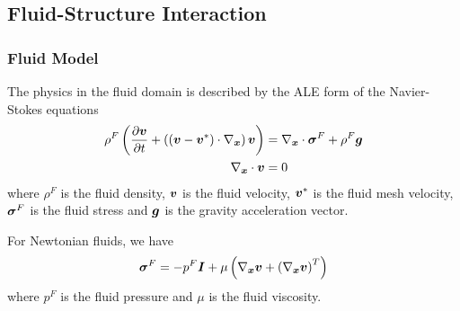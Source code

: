 \subsection{Fluid-Structure Interaction}

\subsubsection{Fluid Model}

The physics in the fluid domain is described by the ALE form of the Navier-Stokes equations
\ie
\begin{align}
  \rho^{F}\pbrac{\delby{\vectr{v}}{t}+\pbrac{\dotprod{\pbrac{\vectr{v}-\vectr{v}^{*}}}{\grad_{\vectr{x}}}}\vectr{v}}&=\divergence{\vectr{x}}{\tensor{\sigma}^{F}}+\rho^{F}\vectr{g}\label{eqn:FSINavStokesMomentum}
  \\
    \divergence{\vectr{x}}{\vectr{v}}&=0 \label{eqn:FSINavStokesContinuity}
\end{align}
where $\rho^{F}$ is the fluid density, $\boldsymbol{v}$ is the fluid velocity,
$\boldsymbol{v}^{*}$ is the fluid mesh velocity, $\boldsymbol{\mathit{\sigma}}^{F}$ is the fluid
stress and $\boldsymbol{g}$ is the gravity acceleration vector.

For Newtonian fluids, we have
\begin{equation}
  \tensor{\sigma}^{F}=-p^{F}\tensor{I}+\mu\pbrac{\gradient{\vectr{x}}{\vectr{v}}+\transpose{\pbrac{\gradient{\vectr{x}}{\vectr{v}}}}}
\end{equation}
where $p^{F}$ is the fluid pressure and $\mu$ is the fluid viscosity.

